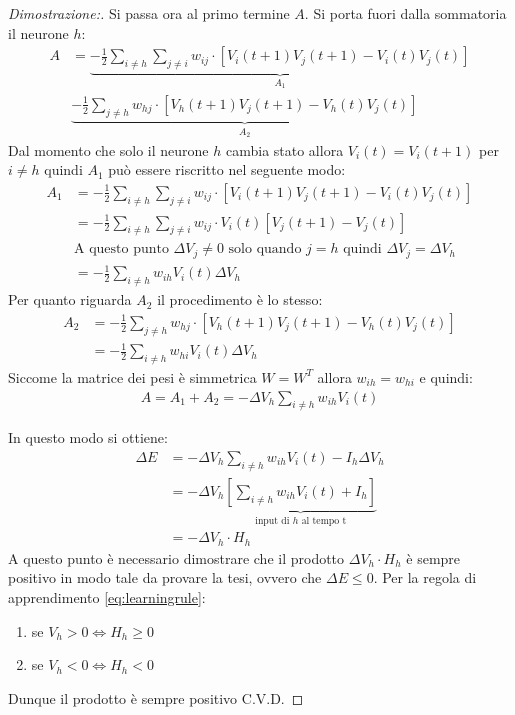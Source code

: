 \begin{proof}[Dimostrazione:]
    Si passa ora al primo termine $A$. Si porta fuori dalla sommatoria il neurone $h$:
    \begin{align*}
        A &= \underbrace{- \frac{1}{2} \sum_{i \neq h} \sum_{j \neq i} w_{ij} \cdot [V_i(t + 1) V_j(t + 1) - V_i(t) V_j(t)]}_\textrm{$A_1$} \\
        & \underbrace{- \frac{1}{2} \sum_{j \neq h} w_{hj} \cdot [V_h(t + 1) V_j(t + 1) - V_h(t) V_j(t)]}_\textrm{$A_2$}
    \end{align*}
    Dal momento che solo il neurone $h$ cambia stato allora $V_i(t) = V_i(t + 1)$ per $i \neq h$ quindi $A_1$ può essere riscritto nel seguente modo:
    \begin{align*}
        A_1 &= - \frac{1}{2} \sum_{i \neq h} \sum_{j \neq i} w_{ij} \cdot [V_i(t + 1) V_j(t + 1) - V_i(t) V_j(t)] \\
        &= - \frac{1}{2} \sum_{i \neq h} \sum_{j \neq i} w_{ij} \cdot V_i(t) [V_j(t + 1) - V_j(t)] \\
        &\text{A questo punto $\Delta V_j \neq 0$ solo quando $j = h$ quindi $\Delta V_j = \Delta V_h$} \\
        &= - \frac{1}{2} \sum_{i \neq h} w_{ih} V_i(t) \Delta V_h
    \end{align*}
    Per quanto riguarda $A_2$ il procedimento è lo stesso:
    \begin{align*}
        A_2 &= - \frac{1}{2} \sum_{j \neq h} w_{hj} \cdot [V_h(t + 1) V_j(t + 1) - V_h(t) V_j(t)] \\
        &= - \frac{1}{2} \sum_{i \neq h} w_{hi} V_i(t) \Delta V_h
    \end{align*}
    Siccome la matrice dei pesi è simmetrica $W = W^T$ allora $w_{ih} = w_{hi}$ e quindi:
    \begin{align*}
        A = A_1 + A_2 = - \Delta V_h \sum_{i \neq h} w_{ih} V_i(t)
    \end{align*}
	
	\newpage
	
    In questo modo si ottiene:
    \begin{align*}
        \Delta E &= - \Delta V_h \sum_{i \neq h} w_{ih} V_i(t)  - I_h \Delta V_h \\
        &= - \Delta V_h \underbrace{\left[\sum_{i \neq h} w_{ih} V_i(t) + I_h \right]}_\textrm{input di $h$ al tempo t} \\
        &= - \Delta V_h \cdot H_h
    \end{align*}
A questo punto è necessario dimostrare che il prodotto $\Delta V_h \cdot H_h$ è sempre positivo in modo tale da provare la tesi, ovvero che $\Delta E \leq 0$. Per la regola di apprendimento \eqref{eq:learningrule}:
\begin{enumerate}
    \item se $V_h > 0 \Leftrightarrow H_h \geq 0$
    \item se $V_h < 0 \Leftrightarrow H_h < 0$
\end{enumerate}
Dunque il prodotto è sempre positivo C.V.D.
\end{proof}

